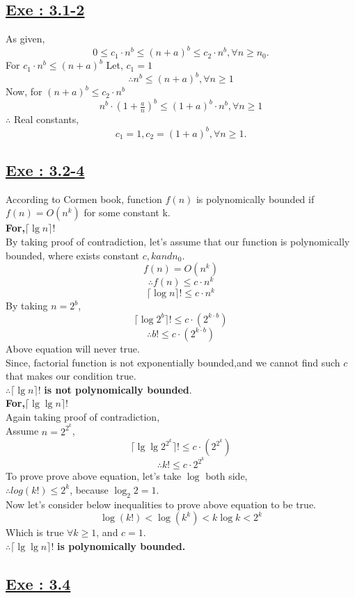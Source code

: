 \documentclass[a4paper, 11pt]{article}
\begin{document}
\subsection*{\underline{Exe : 3.1-2}}
As given,
$$0 \le c_{1}\cdot n^b \le (n+a)^b \le c_{2}\cdot n^b,\forall n\ge n_{0}.$$
For $c_{1}\cdot n^b \le (n+a)^b$\newline
Let, $c_{1}=1$
$$\therefore n^b \le (n+a)^b, \forall n \ge 1$$
Now, for $(n+a)^b \le c_{2}\cdot n^b$
$$n^b \cdot (1+\tfrac{a}{n})^b \le (1+a)^b \cdot n^b,\forall n \ge 1$$   
$\therefore$ Real constants,
$$c_{1}=1, c_{2}=(1+a)^b , \forall n \ge 1.$$


\subsection*{\underline{Exe : 3.2-4}}
According to Cormen book, function $f(n)$ is polynomically bounded if $f(n) = O(n^k)$ for some constant k.\\
\textbf{For,$ \lceil \lg n \rceil ! $}\\
By taking proof of contradiction, let's assume that our function is polynomically bounded, where exists constant $ c,k and n_{0}$.
$$f(n)=O(n^k)$$
$$\therefore f(n) \le c \cdot n^k$$
$$\lceil \log n \rceil ! \le c \cdot n^k$$
By taking $n=2^b$,
$$\lceil \log 2^b \rceil ! \le c \cdot (2^{k \cdot b})$$
$$\therefore b ! \le c \cdot (2^{k \cdot b})$$
Above equation will never true.\\
Since, factorial function is not exponentially bounded,and we cannot find such $c$ that makes our condition true.\\
$\therefore \lceil \lg n \rceil ! $ \textbf{ is not polynomically bounded}. \\
\textbf{For,$ \lceil \lg \lg n \rceil ! $}\\
Again taking proof of contradiction,\\
Assume $n=2^{2^k}$,
$$ \lceil \lg \lg 2^{2^k} \rceil ! \le c \cdot (2^{2^k}) $$
$$\therefore k! \le c \cdot 2^{2^k}$$ 
To prove prove above equation, let's take $\log$ both side,\\
$\therefore log(k!) \le 2^k$, because $\log_{2}2 =1$.\\
Now let's consider below inequalities to prove above equation to be true.
$$ \log(k!) < \log(k^k) < k\log k < 2^k $$
Which is true $\forall k \ge 1$, and $c=1$.\\
$\therefore \lceil \lg \lg n \rceil ! $ \textbf{is polynomically bounded.}

\subsection*{\underline{Exe : 3.4}}
\end{document}
